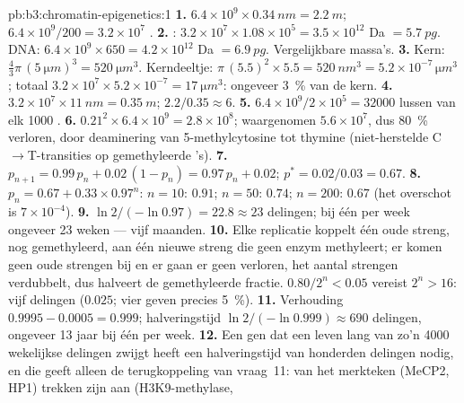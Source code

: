 \begin{solution}{pb:b3:chromatin-epigenetics:1}
\textbf{1.} $6.4\times 10^{9}\times \qty{0.34}{nm} = \qty{2.2}{m}$;
$6.4\times 10^{9}/200 = 3.2\times 10^{7}$ .
\textbf{2.} : $3.2\times 10^{7}\times 1.08\times 10^{5} =
3.5\times 10^{12}$ Da $= \qty{5.7}{pg}$. DNA: $6.4\times 10^{9}\times
650 = 4.2\times 10^{12}$ Da $= \qty{6.9}{pg}$. Vergelijkbare massa's.
\textbf{3.} Kern: $\tfrac{4}{3}\pi\,(\qty{5}{\micro m})^{3} =
\qty{520}{\micro m^3}$. Kerndeeltje: $\pi\,(5.5)^{2}\times 5.5 =
\qty{520}{nm^3} = 5.2\times 10^{-7}\,\unit{\micro m^3}$; totaal
$3.2\times 10^{7}\times 5.2\times 10^{-7} = \qty{17}{\micro m^3}$:
ongeveer \qty{3}{\%} van de kern.
\textbf{4.} $3.2\times 10^{7}\times \qty{11}{nm} = \qty{0.35}{m}$;
 $2.2/0.35 \approx 6$.
\textbf{5.} $6.4\times 10^{9}/2\times 10^{5} = \num{32000}$ lussen van
elk \num{1000} .
\textbf{6.} $0.21^{2}\times 6.4\times 10^{9} = 2.8\times 10^{8}$;
waargenomen $5.6\times 10^{7}$, dus \qty{80}{\%} verloren, door
deaminering van 5-methylcytosine tot thymine (niet-herstelde
C$\to$T-transities op gemethyleerde 's).
\textbf{7.} $p_{n+1} = 0.99\,p_{n} + 0.02\,(1 - p_{n}) = 0.97\,p_{n} +
0.02$; $p^{*} = 0.02/0.03 = 0.67$.
\textbf{8.} $p_{n} = 0.67 + 0.33\times 0.97^{n}$: $n = 10$: $0.91$;
$n = 50$: $0.74$; $n = 200$: $0.67$ (het overschot is $7\times 10^{-4}$).
\textbf{9.} $\ln 2/(-\ln 0.97) = 22.8 \approx 23$ delingen; bij één per
week ongeveer \num{23} weken --- vijf maanden.
\textbf{10.} Elke replicatie koppelt één oude streng, nog gemethyleerd,
aan één nieuwe streng die geen enzym methyleert; er komen geen oude
strengen bij en er gaan er geen verloren, het aantal strengen
verdubbelt, dus halveert de gemethyleerde fractie. $0.80/2^{n} < 0.05$
vereist $2^{n} > 16$: vijf delingen ($0.025$; vier geven precies
\qty{5}{\%}).
\textbf{11.} Verhouding $0.9995 - 0.0005 = 0.999$; halveringstijd $\ln
2/(-\ln 0.999) \approx 690$ delingen, ongeveer \num{13} jaar bij één
per week.
\textbf{12.} Een gen dat een leven lang van zo'n \num{4000} wekelijkse
delingen zwijgt heeft een halveringstijd van honderden delingen nodig,
en die geeft alleen de terugkoppeling van vraag~11:  van het
merkteken (MeCP2, HP1) trekken zijn  aan (H3K9-methylase,

\end{solution}
